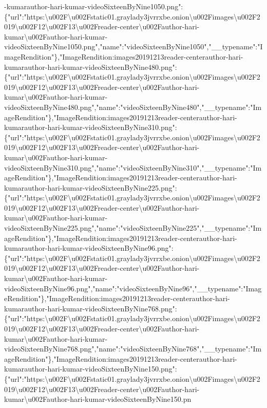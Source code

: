 -kumarauthor-hari-kumar-videoSixteenByNine1050.png":\{"url":"https:\textbackslash{}u002F\textbackslash{}u002Fstatic01.graylady3jvrrxbe.onion\textbackslash{}u002Fimages\textbackslash{}u002F2019\textbackslash{}u002F12\textbackslash{}u002F13\textbackslash{}u002Freader-center\textbackslash{}u002Fauthor-hari-kumar\textbackslash{}u002Fauthor-hari-kumar-videoSixteenByNine1050.png","name":"videoSixteenByNine1050","\_\_typename":"ImageRendition"\},"ImageRendition:images20191213reader-centerauthor-hari-kumarauthor-hari-kumar-videoSixteenByNine480.png":\{"url":"https:\textbackslash{}u002F\textbackslash{}u002Fstatic01.graylady3jvrrxbe.onion\textbackslash{}u002Fimages\textbackslash{}u002F2019\textbackslash{}u002F12\textbackslash{}u002F13\textbackslash{}u002Freader-center\textbackslash{}u002Fauthor-hari-kumar\textbackslash{}u002Fauthor-hari-kumar-videoSixteenByNine480.png","name":"videoSixteenByNine480","\_\_typename":"ImageRendition"\},"ImageRendition:images20191213reader-centerauthor-hari-kumarauthor-hari-kumar-videoSixteenByNine310.png":\{"url":"https:\textbackslash{}u002F\textbackslash{}u002Fstatic01.graylady3jvrrxbe.onion\textbackslash{}u002Fimages\textbackslash{}u002F2019\textbackslash{}u002F12\textbackslash{}u002F13\textbackslash{}u002Freader-center\textbackslash{}u002Fauthor-hari-kumar\textbackslash{}u002Fauthor-hari-kumar-videoSixteenByNine310.png","name":"videoSixteenByNine310","\_\_typename":"ImageRendition"\},"ImageRendition:images20191213reader-centerauthor-hari-kumarauthor-hari-kumar-videoSixteenByNine225.png":\{"url":"https:\textbackslash{}u002F\textbackslash{}u002Fstatic01.graylady3jvrrxbe.onion\textbackslash{}u002Fimages\textbackslash{}u002F2019\textbackslash{}u002F12\textbackslash{}u002F13\textbackslash{}u002Freader-center\textbackslash{}u002Fauthor-hari-kumar\textbackslash{}u002Fauthor-hari-kumar-videoSixteenByNine225.png","name":"videoSixteenByNine225","\_\_typename":"ImageRendition"\},"ImageRendition:images20191213reader-centerauthor-hari-kumarauthor-hari-kumar-videoSixteenByNine96.png":\{"url":"https:\textbackslash{}u002F\textbackslash{}u002Fstatic01.graylady3jvrrxbe.onion\textbackslash{}u002Fimages\textbackslash{}u002F2019\textbackslash{}u002F12\textbackslash{}u002F13\textbackslash{}u002Freader-center\textbackslash{}u002Fauthor-hari-kumar\textbackslash{}u002Fauthor-hari-kumar-videoSixteenByNine96.png","name":"videoSixteenByNine96","\_\_typename":"ImageRendition"\},"ImageRendition:images20191213reader-centerauthor-hari-kumarauthor-hari-kumar-videoSixteenByNine768.png":\{"url":"https:\textbackslash{}u002F\textbackslash{}u002Fstatic01.graylady3jvrrxbe.onion\textbackslash{}u002Fimages\textbackslash{}u002F2019\textbackslash{}u002F12\textbackslash{}u002F13\textbackslash{}u002Freader-center\textbackslash{}u002Fauthor-hari-kumar\textbackslash{}u002Fauthor-hari-kumar-videoSixteenByNine768.png","name":"videoSixteenByNine768","\_\_typename":"ImageRendition"\},"ImageRendition:images20191213reader-centerauthor-hari-kumarauthor-hari-kumar-videoSixteenByNine150.png":\{"url":"https:\textbackslash{}u002F\textbackslash{}u002Fstatic01.graylady3jvrrxbe.onion\textbackslash{}u002Fimages\textbackslash{}u002F2019\textbackslash{}u002F12\textbackslash{}u002F13\textbackslash{}u002Freader-center\textbackslash{}u002Fauthor-hari-kumar\textbackslash{}u002Fauthor-hari-kumar-videoSixteenByNine150.pn